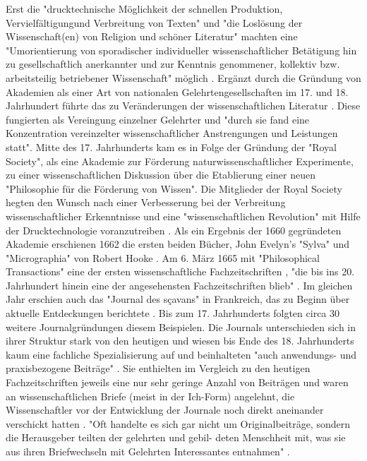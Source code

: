 Erst die "drucktechnische Möglichkeit der schnellen Produktion, Vervielfältigungund Verbreitung von Texten" und "die Loslösung der Wissenschaft(en) von Religion und schöner Literatur" machten eine "Umorientierung von sporadischer individueller wissenschaftlicher Betätigung hin zu gesellschaftlich anerkannter und zur Kenntnis genommener, kollektiv bzw. arbeitsteilig betriebener Wissenschaft" möglich \cite{graefen2007_wissenschaftliche_artikel}. Ergänzt durch die Gründung von Akademien als einer Art von nationalen Gelehrtengesellschaften im 17. und 18. Jahrhundert führte das zu Veränderungen der wissenschaftlichen Literatur \cite{graefen2007_wissenschaftliche_artikel}. Diese fungierten als Vereingung einzelner Gelehrter und "durch sie fand eine Konzentration vereinzelter wissenschaftlicher Anstrengungen und Leistungen statt"\cite{graefen2007_wissenschaftliche_artikel}. Mitte des 17. Jahrhunderts kam es in Folge der Gründung der "Royal Society", als eine Akademie zur Förderung naturwissenschaftlicher Experimente, zu einer wissenschaftlichen Diskussion über die Etablierung einer neuen "Philosophie für die Förderung von Wissen". Die Mitglieder der Royal Society hegten den Wunsch nach einer Verbesserung bei der Verbreitung wissenschaftlicher Erkenntnisse und eine "wissenschaftlichen Revolution" mit Hilfe der Drucktechnologie voranzutreiben \cite{Dear_1985}. Als ein Ergebnis der 1660 gegründeten Akademie erschienen 1662 die ersten beiden Bücher, John Evelyn's "Sylva" und "Micrographia" von Robert Hooke \cite{hall_1992_library_rsol}. Am 6. März 1665 mit "Philosophical Transactions" eine der ersten wissenschaftliche Fachzeitschriften \cite{suchen}, "die bis ins 20. Jahrhundert hinein eine der angesehensten Fachzeitschriften blieb" \cite{graefen2007_wissenschaftliche_artikel}. Im gleichen Jahr erschien auch das "Journal des sçavans" in Frankreich, das zu Beginn über aktuelle Entdeckungen berichtete \cite{epaa_Weiner_2001}. Bis zum 17. Jahrhunderts folgten circa 30 weitere Journalgründungen diesem Beispielen. Die Journals unterschieden sich in ihrer Struktur stark von den heutigen und wiesen bis Ende des 18. Jahrhunderts kaum eine fachliche Spezialisierung auf und beinhalteten "auch anwendungs- und praxisbezogene Beiträge" \cite{graefen2007_wissenschaftliche_artikel}. Sie enthielten im Vergleich zu den heutigen Fachzeitschriften jeweils eine nur sehr geringe Anzahl von Beiträgen \cite{suchen} und waren an wissenschaftlichen Briefe (meist in der Ich-Form) angelehnt, die Wissenschaftler vor der Entwicklung der Journale noch direkt aneinander verschickt hatten \cite{epaa_Weiner_2001}. "Oft handelte es sich gar nicht um Originalbeiträge, sondern die Herausgeber teilten der gelehrten und gebil- deten Menschheit mit, was sie aus ihren Briefwechseln mit Gelehrten Interessantes entnahmen" \cite{graefen2007_wissenschaftliche_artikel}.

